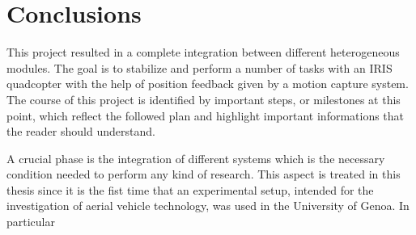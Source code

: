 \def\baselinestretch{1}
\chapter{Conclusions}
\label{chap:conclusions}
\ifpdf
    \graphicspath{{Conclusions/Figures/PNG/}{Conclusions/Figures/PDF/}{Conclusions/Figures/}}
\else
    \graphicspath{{Conclusions/Figures/EPS/}{Conclusions/Figures/}}
\fi
\def\baselinestretch{1.66}

This project resulted in a complete integration between different heterogeneous modules. The goal is to stabilize and perform a number of tasks with an IRIS quadcopter with the help of position feedback given by a motion capture system. The course of this project is identified by important steps, or milestones at this point, which reflect the followed plan and highlight important informations that the reader should understand. 

A crucial phase is the integration of different systems which is the necessary condition needed to perform any kind of research. This aspect is treated in this thesis since it is the fist time that an experimental setup, intended for the investigation of aerial vehicle technology, was used in the University of Genoa. In particular
